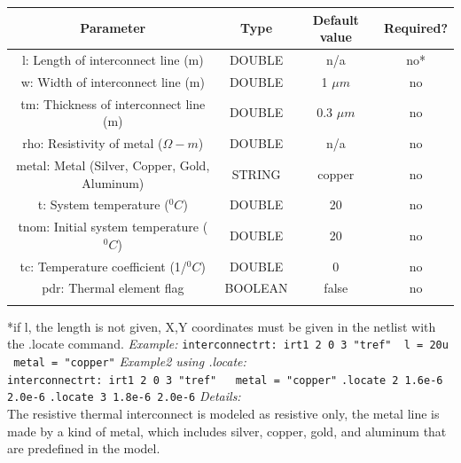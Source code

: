 \documentclass{article}
\begin{document}
\begin{table}[H]
\begin{tabular}{|c|c|c|c|}
\hline
Parameter&Type&Default value&Required?\\
\hline
l: Length of interconnect line (m) & DOUBLE &  n/a & no* \\
\hline
w: Width of interconnect line (m) & DOUBLE & 1 $\mu m$ & no \\
\hline
tm: Thickness of interconnect line (m) & DOUBLE & 0.3 $\mu m$  & no \\
\hline
rho: Resistivity of metal  ($\Omega-m$)& DOUBLE & n/a & no \\
\hline
metal: Metal (Silver, Copper, Gold, Aluminum) & STRING & copper & no \\
\hline
t: System temperature ($^0C$) & DOUBLE & 20 & no \\
\hline
tnom: Initial system temperature ($^0C$) & DOUBLE & 20 & no \\
\hline
tc: Temperature coefficient (1/$^0C$) & DOUBLE & 0 & no \\
\hline
pdr:  Thermal element flag & BOOLEAN & false & no \\
\par
\hline
\end{tabular}
\end{table}
*if l, the length is not given, X,Y coordinates must be given in the netlist with the .locate command.
\noindent\myThickLine
\newline
\textit{Example:}
\newline
\texttt{interconnectrt:\ irt1\ 2\ 0\ 3\ "tref" \ l = 20u \ metal = "copper"}
\newline
\textit{Example2 using .locate:}
\newline
\texttt{interconnectrt:\ irt1\ 2\ 0\ 3\ "tref" \ \ metal = "copper"}
\newline
\texttt{.locate 2 1.6e-6 2.0e-6}
\newline
\texttt{.locate 3 1.8e-6 2.0e-6}
\newline
\myThickLine
\textit{Details:}\\
The resistive thermal interconnect is modeled as resistive only, the metal line is made by a kind of metal, which includes silver, copper, gold, and aluminum that are predefined in the model. \\
\end{document}
